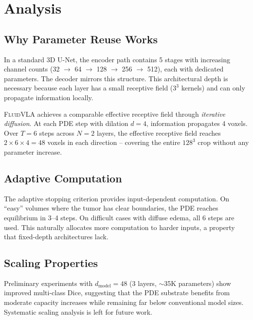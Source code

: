 \documentclass{article}
\newcommand{\fluidvla}{\textsc{FluidVLA}}
\begin{document}
\section{Analysis}
\label{sec:analysis}

\subsection{Why Parameter Reuse Works}

In a standard 3D U-Net, the encoder path contains 5 stages with increasing channel counts (32 $\to$ 64 $\to$ 128 $\to$ 256 $\to$ 512), each with dedicated parameters. The decoder mirrors this structure. This architectural depth is necessary because each layer has a small receptive field ($3^3$ kernels) and can only propagate information locally.

\fluidvla{} achieves a comparable effective receptive field through \emph{iterative diffusion}. At each PDE step with dilation $d=4$, information propagates 4 voxels. Over $T=6$ steps across $N=2$ layers, the effective receptive field reaches $2 \times 6 \times 4 = 48$ voxels in each direction -- covering the entire $128^3$ crop without any parameter increase.

\subsection{Adaptive Computation}

The adaptive stopping criterion provides input-dependent computation. On ``easy'' volumes where the tumor has clear boundaries, the PDE reaches equilibrium in 3--4 steps. On difficult cases with diffuse edema, all 6 steps are used. This naturally allocates more computation to harder inputs, a property that fixed-depth architectures lack.

\subsection{Scaling Properties}

Preliminary experiments with $d_\text{model} = 48$ (3 layers, $\sim$35K parameters) show improved multi-class Dice, suggesting that the PDE substrate benefits from moderate capacity increases while remaining far below conventional model sizes. Systematic scaling analysis is left for future work.
\end{document}
